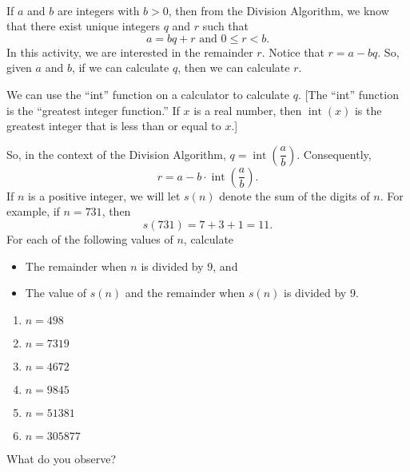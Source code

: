 \begin{previewactivity} \label{PA:remainderdivide9} \hfill \\
If  $a$  and  $b$  are integers with  $b > 0$, then from the Division Algorithm, we know that there exist unique integers  $q$  and  $r$ such that  
\[
a = bq + r \text{ and } 0 \leq r < b.
\]
In this activity, we are interested in the remainder  $r$.  Notice that  $r = a - bq$.  So, given $a$ and $b$, if we can calculate  $q$, then we can calculate  $r$.  

We can use the ``int'' function on a calculator to calculate  $q$.  [The ``int'' function is the ``greatest integer function.''  If  $x$  is a real number, then  
$\operatorname{int}( x )$  is the greatest integer that is less than or equal to  $x$.]

So, in the context of the Division Algorithm,  
$q = \operatorname{int} \!\left( {\dfrac{a}{b}} \right)$.  Consequently,
\[
r = a - b \cdot \operatorname{int} \!\left( {\frac{a}{b}} \right).
\]
If  $n$  is a positive integer, we will let  $s\left( n \right)$  denote the sum of the digits of  $n$.  For example,  if  $n = 731$, then
\[
s( {731} ) = 7 + 3 + 1 = 11.
\]
\noindent
For each of the following values of  $n$, calculate
\begin{itemize}
  \item The remainder when $n$ is divided by 9, and
  \item The value of $s( n )$ and the remainder when $s( n )$ is divided by 9.
\end{itemize}

%
\begin{multicols}{3}
\begin{enumerate}
\item $n=498$
\item $n=7319$
\item $n=4672$
\item $n=9845$
\item $n=51381$
\item $n=305877$
\end{enumerate}
\end{multicols}
\noindent
What do you observe?
\end{previewactivity}
\hbreak

\endinput
